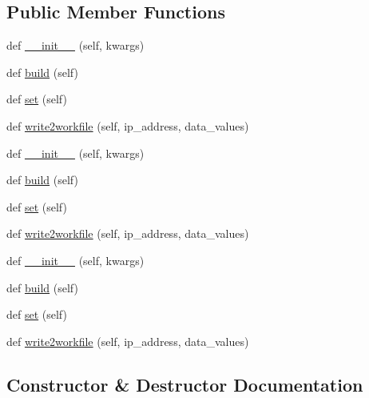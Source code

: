 \subsection*{Public Member Functions}
\begin{DoxyCompactItemize}
\item 
def \hyperlink{classTestingGUI_1_1RoomView_a4b1054e4342d94f4a73fecf2e3221b99}{\+\_\+\+\_\+init\+\_\+\+\_\+} (self, kwargs)
\item 
def \hyperlink{classTestingGUI_1_1RoomView_aaf1a3057048d6a1e9533750454ad5abd}{build} (self)
\item 
def \hyperlink{classTestingGUI_1_1RoomView_ab3b8e27d2d4c7ff91fdcaff4a8f53431}{set} (self)
\item 
def \hyperlink{classTestingGUI_1_1RoomView_a2c0434bb69cf431a9631990c9d445411}{write2workfile} (self, ip\+\_\+address, data\+\_\+values)
\item 
def \hyperlink{classTestingGUI_1_1RoomView_a4b1054e4342d94f4a73fecf2e3221b99}{\+\_\+\+\_\+init\+\_\+\+\_\+} (self, kwargs)
\item 
def \hyperlink{classTestingGUI_1_1RoomView_aaf1a3057048d6a1e9533750454ad5abd}{build} (self)
\item 
def \hyperlink{classTestingGUI_1_1RoomView_ab3b8e27d2d4c7ff91fdcaff4a8f53431}{set} (self)
\item 
def \hyperlink{classTestingGUI_1_1RoomView_a2c0434bb69cf431a9631990c9d445411}{write2workfile} (self, ip\+\_\+address, data\+\_\+values)
\item 
def \hyperlink{classTestingGUI_1_1RoomView_a4b1054e4342d94f4a73fecf2e3221b99}{\+\_\+\+\_\+init\+\_\+\+\_\+} (self, kwargs)
\item 
def \hyperlink{classTestingGUI_1_1RoomView_aaf1a3057048d6a1e9533750454ad5abd}{build} (self)
\item 
def \hyperlink{classTestingGUI_1_1RoomView_ab3b8e27d2d4c7ff91fdcaff4a8f53431}{set} (self)
\item 
def \hyperlink{classTestingGUI_1_1RoomView_a2c0434bb69cf431a9631990c9d445411}{write2workfile} (self, ip\+\_\+address, data\+\_\+values)
\end{DoxyCompactItemize}


\subsection{Constructor \& Destructor Documentation}
